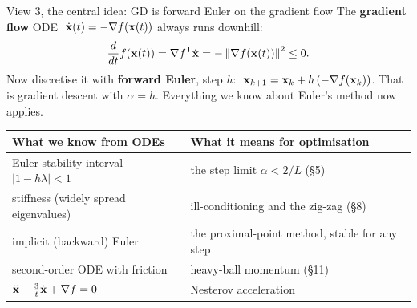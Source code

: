 \begin{frame}{View 3, the central idea: GD is forward Euler on the gradient flow}
  The \textbf{gradient flow} ODE $\;\dot{\mathbf{x}}(t) = -\nabla f(\mathbf{x}(t))$ always runs downhill:
  \[
    \frac{d}{dt}f(\mathbf{x}(t)) = \nabla f^{\mathsf T}\dot{\mathbf{x}} = -\left\lVert \nabla f(\mathbf{x}(t)) \right\rVert^2 \le 0 .
  \]
  Now discretise it with \textbf{forward Euler}, step $h$: $\;\mathbf{x}_{k+1} = \mathbf{x}_k + h\,(-\nabla f(\mathbf{x}_k))$.
  That is \alert{gradient descent with $\alpha = h$}. Everything we know about Euler's method now applies.

  \vspace{4pt}
  \centering\small
  \begin{tabular}{@{}l l@{}}
    \toprule
    What we know from ODEs & What it means for optimisation \\
    \midrule
    Euler stability interval $|1 - h\lambda| < 1$ & the step limit $\alpha < 2/L$ (\S5) \\
    stiffness (widely spread eigenvalues) & ill-conditioning and the zig-zag (\S8) \\
    implicit (backward) Euler & the proximal-point method, stable for any step \\
    second-order ODE with friction & heavy-ball momentum (\S11) \\
    $\ddot{\mathbf{x}} + \tfrac3t\dot{\mathbf{x}} + \nabla f = 0$ & Nesterov acceleration~\cite{su2016} \\
    \bottomrule
  \end{tabular}
\end{frame}


